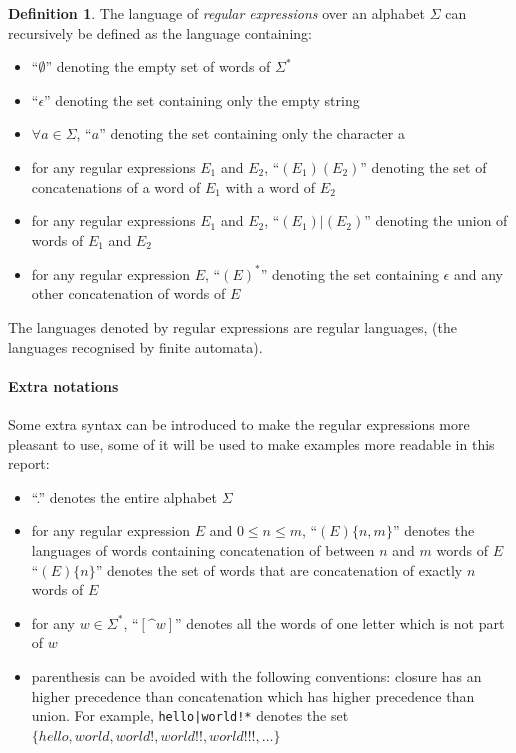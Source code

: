 \documentclass[12px]{article}
\theoremstyle{definition}
\newtheorem{definition}{Definition}
\begin{document}
        \begin{definition}
          The language of \textit{regular expressions} over an alphabet
          $\Sigma$ can recursively be defined as the language containing:
            \begin{itemize}
              \item ``$\emptyset$'' denoting the empty set of words of
                $\Sigma^*$
              \item ``$\epsilon$'' denoting the set containing only the empty
                string
              \item $\forall a \in \Sigma$, ``$a$'' denoting the set containing
                only the character a
              \item for any regular expressions $E_1$ and $E_2$, ``$(E_1)
                (E_2)$'' denoting the set of concatenations of a word of $E_1$
                with a word of $E_2$
              \item for any regular expressions $E_1$ and $E_2$,
                ``$(E_1)|(E_2)$'' denoting the union of words of $E_1$ and
                $E_2$
              \item for any regular expression $E$, ``${(E)}^*$'' denoting the
                set containing $\epsilon$ and any other concatenation of words
                of $E$
            \end{itemize}

          The languages denoted by regular expressions are regular languages,
          (the languages recognised by finite automata).
        \end{definition}

        \paragraph{Extra notations}
          Some extra syntax can be introduced to make the
          regular expressions more pleasant to use, some of it will be used to
          make examples more readable in this report:
            \begin{itemize}
              \item ``.'' denotes the entire alphabet $\Sigma$
              \item for any regular expression $E$ and $0 \leq n \leq m$,
                ``$(E)\{n,m\}$'' denotes the languages of words containing
                concatenation of between $n$ and $m$ words of $E$
                ``$(E)\{n\}$'' denotes the set of words that are concatenation
                of exactly $n$ words of $E$
              \item for any $w \in \Sigma^*$,
                ``$[\texttt{\textasciicircum}w]$'' denotes all the words of one
                letter which is not part of $w$
              \item parenthesis can be avoided with the following conventions:
                closure has an higher precedence than concatenation which has
                higher precedence than union. For example,
                \texttt{hello|world!*} denotes the set $\{hello, world, world!,
                world!!, world!!!, \ldots\}$
            \end{itemize}
\end{document}
